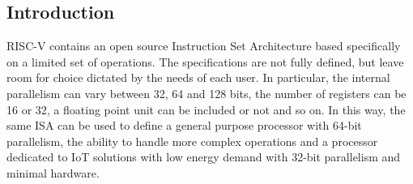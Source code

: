 \subsection{Introduction}
RISC-V contains an open source Instruction Set Architecture based specifically on a limited set of operations. The specifications are not fully defined, but leave room for choice dictated by the needs of each user. In particular, the internal parallelism can vary between 32, 64 and 128 bits, the number of registers can be 16 or 32, a floating point unit can be included or not and so on. In this way, the same ISA can be used to define a general purpose processor with 64-bit parallelism, the ability to handle more complex operations and a processor dedicated to IoT solutions with low energy demand with 32-bit parallelism and minimal hardware.\\
